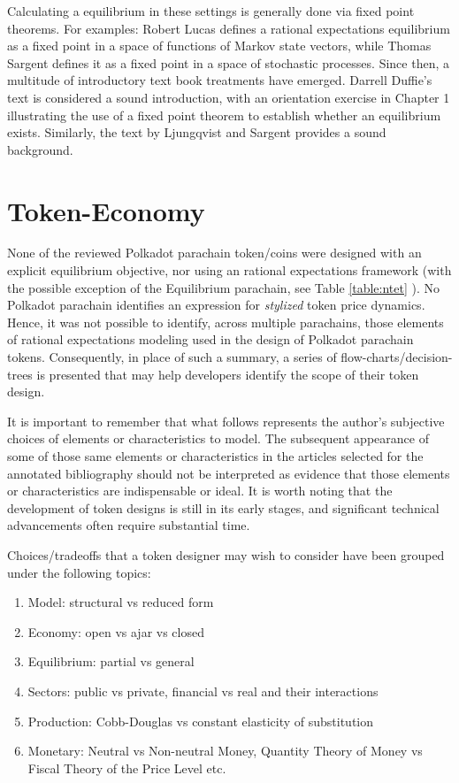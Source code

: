 \documentclass[11pt]{article}
\begin{document}
Calculating a equilibrium in these settings is generally done via fixed point theorems.  For examples: Robert Lucas\autocite{lucas72} defines a rational expectations equilibrium as a fixed point in a space of functions of Markov state vectors, while Thomas Sargent\autocite{sargent71} defines it as a fixed point in a space of stochastic processes. Since then, a multitude of introductory text book treatments have emerged. Darrell Duffie's text\autocite{duffie01} is considered a sound introduction, with an orientation exercise in Chapter 1 illustrating the use of a fixed point theorem to establish whether an equilibrium exists. Similarly, the text\autocite{ljungqvist18} by Ljungqvist and Sargent provides a sound background.

\section{Token-Economy}

None of the reviewed Polkadot parachain token/coins were designed with an explicit equilibrium objective, nor using an rational expectations framework (with the possible exception of the Equilibrium parachain, see Table \ref{table:ntet} ). No Polkadot parachain identifies an expression for \textit{stylized} token price dynamics.
Hence, it was not possible to identify, across multiple parachains, those elements of rational expectations modeling used in the design of Polkadot parachain tokens. Consequently, in place of such a summary, a series of flow-charts/decision-trees is presented that may help developers identify the scope of their token design. 

It is important to remember that what follows represents the author's subjective choices of elements or characteristics to model. The subsequent appearance of some of those same elements or characteristics in the articles selected for the annotated bibliography should not be interpreted as evidence that those elements or characteristics are indispensable or ideal. It is worth noting that the development of token designs is still in its early stages, and significant technical advancements often require substantial time.

Choices/tradeoffs that a token designer may wish to consider have been grouped under the following topics:

\begin{enumerate}
    \item[] Model: structural vs reduced form
    \item[] Economy: open vs ajar vs closed
    \item[] Equilibrium: partial vs general
    \item[] Sectors: public vs private, financial vs real and their interactions
    \item[] Production: Cobb-Douglas vs constant elasticity of substitution
    \item[] Monetary: Neutral vs Non-neutral Money, Quantity Theory of Money vs Fiscal Theory of the Price Level etc.
\end{enumerate}
\end{document}
